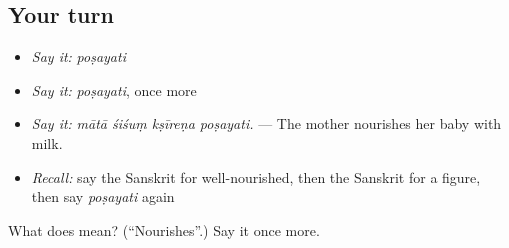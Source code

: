 \subsection*{Your turn}
\begin{itemize}
\raggedright
  \item \emph{Say it:} \emph{poṣayati}
  \item \emph{Say it:} \emph{poṣayati}, once more
  \item \emph{Say it:} \emph{mātā śiśuṃ kṣīreṇa poṣayati.} — The mother nourishes her baby with milk.
  \item \emph{Recall:} say the Sanskrit for well-nourished, then the Sanskrit for a figure, then say \emph{poṣayati} again
\end{itemize}

\begin{tcolorbox}[breakable,colback=teal!4,colframe=teal!35!black,title={Before you move on}]
What does  mean? (\textquotedblleft{}Nourishes\textquotedblright{}.) Say it once more.
\end{tcolorbox}
